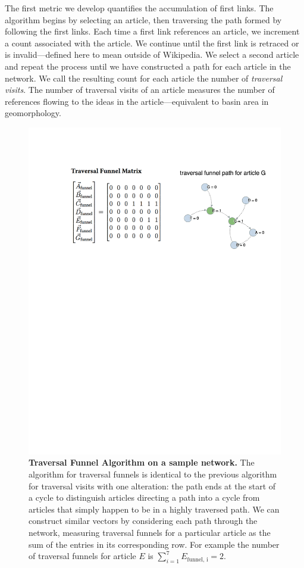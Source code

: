 \documentclass[pre,twocolumn,twoside,superscriptaddress,floatfix, aps, 10pt]{revtex4-1}
\begin{document}
The first metric we develop quantifies the accumulation of first links.
The algorithm begins by selecting an article, then traversing the path formed
by following the first links. Each time a first link references an article, we increment a count
associated with the article. 
We continue until the first link is retraced or is invalid---defined here to mean outside of Wikipedia.
We select a second article and repeat the process until we have 
constructed a path for each article in the network. We call the resulting count for each article the number of {\it traversal visits}. The number of traversal visits of an article 
measures the number of references flowing to the ideas in the article---equivalent
to basin area in geomorphology. 

\begin{figure}[tp!]
  \centering	
  \includegraphics[width=\columnwidth]{graphics/traversal_funnel_algo_figure.pdf}
  \caption{
    \textbf{Traversal Funnel Algorithm on a sample network.}
  The algorithm for traversal funnels is identical to the previous algorithm for traversal visits with one alteration: the path ends at the start of a cycle to distinguish articles directing a path into a cycle from articles that simply happen to be in a highly traversed path. We can construct similar vectors by considering each path through the network, measuring traversal funnels for a particular article as the sum of the entries in its corresponding row. For example
  the number of traversal funnels for article $E$ is 
  $\sum_{i=1}^7 E_{\text{funnel, i}} = 2$.}
  \label{fig:Traversal Funnels}

\end{figure}
\end{document}
